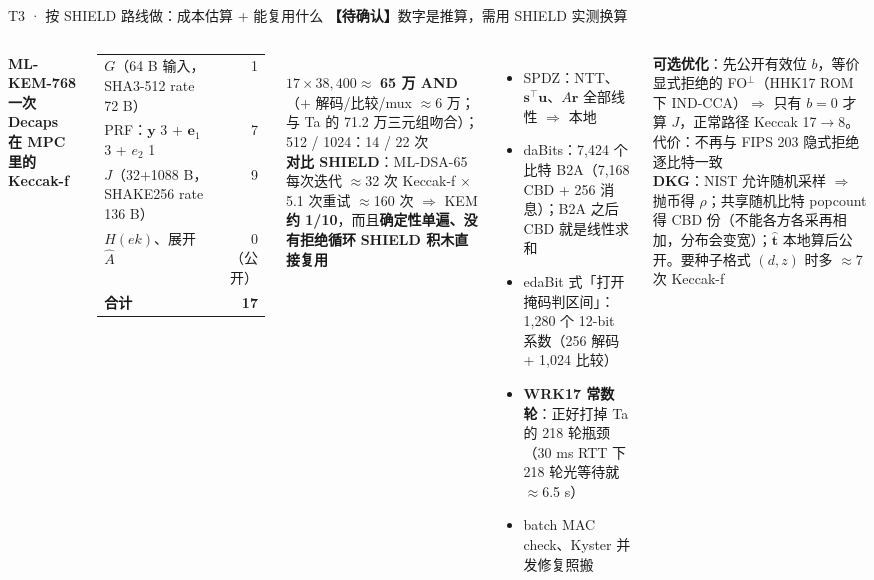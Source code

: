 \documentclass[aspectratio=169,10pt,fontset=none]{ctexbeamer}
\newcommand{\warn}[1]{{\color{warn}\textbf{【待确认】}#1}}
\begin{document}
\begin{frame}{T3 · 按 SHIELD 路线做：成本估算 + 能复用什么 \warn{数字是推算，需用 SHIELD 实测换算}}
\begin{columns}[T]
\textbf{ML-KEM-768 一次 Decaps 在 MPC 里的 Keccak-f}\\[2pt]
{\scriptsize\begin{tabular}{@{}lr@{}}\toprule
$G$（64 B 输入，SHA3-512 rate 72 B）& 1 \\
PRF：$\mathbf y$ 3 + $\mathbf e_1$ 3 + $e_2$ 1 & 7 \\
$J$（32+1088 B，SHAKE256 rate 136 B）& 9 \\
$H(ek)$、展开 $\hat A$ & 0（公开）\\\midrule
\textbf{合计} & \textbf{17} \\\bottomrule
\end{tabular}}\\[2pt]
$17\times38{,}400\approx$ \textbf{65 万 AND}（+ 解码/比较/mux $\approx$6 万；与 Ta 的 71.2 万三元组吻合）；512 / 1024：14 / 22 次\\[3pt]
\textbf{对比 SHIELD}：ML-DSA-65 每次迭代 $\approx$32 次 Keccak-f $\times$ 5.1 次重试 $\approx$160 次 $\Rightarrow$ KEM \textbf{约 1/10}，而且\textbf{确定性单遍、没有拒绝循环}
\textbf{SHIELD 积木直接复用}
\begin{itemize}
  \item SPDZ：NTT、$\mathbf s^\top\mathbf u$、$A\mathbf r$ 全部线性 $\Rightarrow$ 本地
  \item daBits：7,424 个比特 B2A（7,168 CBD + 256 消息）；B2A 之后 CBD 就是线性求和
  \item edaBit 式「打开掩码判区间」：1,280 个 12-bit 系数（256 解码 + 1,024 比较）
  \item \textbf{WRK17 常数轮}：正好打掉 Ta 的 218 轮瓶颈（30 ms RTT 下 218 轮光等待就 $\approx$6.5 s）
  \item batch MAC check、Kyster 并发修复照搬
\end{itemize}
\textbf{可选优化}：先公开有效位 $b$，等价显式拒绝的 FO$^\perp$（HHK17 ROM 下 IND-CCA）$\Rightarrow$ 只有 $b=0$ 才算 $J$，正常路径 Keccak 17$\to$8。\alert{代价：不再与 FIPS 203 隐式拒绝逐比特一致}\\[3pt]
\textbf{DKG}：NIST 允许随机采样 $\Rightarrow$ 抛币得 $\rho$；共享随机比特 popcount 得 CBD 份（\alert{不能各方各采再相加，分布会变宽}）；$\hat{\mathbf t}$ 本地算后公开。要种子格式 $(d,z)$ 时多 $\approx$7 次 Keccak-f
\end{columns}
\end{frame}
\end{document}
